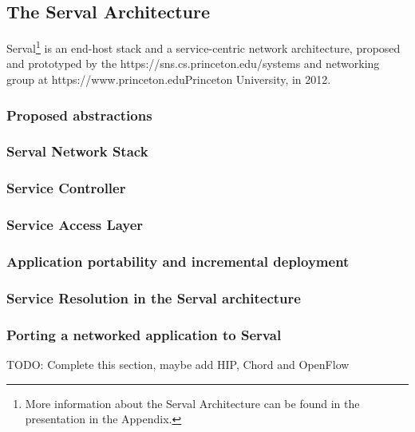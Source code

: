 \subsection{The Serval Architecture}
Serval\footnote{More information about the Serval Architecture can be found in the presentation in the Appendix.} is an end-host stack and a service-centric network architecture, proposed and prototyped by the {https://sns.cs.princeton.edu/}{systems and networking group} at {https://www.princeton.edu}{Princeton University}, in 2012.


\subsubsection{Proposed abstractions}
\subsubsection{Serval Network Stack}
\subsubsection*{Service Controller}
\subsubsection*{Service Access Layer}
\subsubsection{Application portability and incremental deployment}
\subsubsection{Service Resolution in the Serval architecture}
\subsubsection{Porting a networked application to Serval}

TODO: Complete this section, maybe add HIP, Chord and OpenFlow